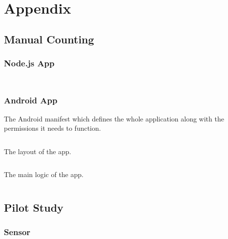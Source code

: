 \chapter{Appendix}

\cleardoublepage

\section{Manual Counting}

\subsection{Node.js App} \label{appendix:manualcount}
\vspace{1em}
\inputminted{javascript}{tools/manual-count/package.json}
\inputminted{javascript}{tools/manual-count/manualcount.js}

\subsection{Android App} \label{appendix:clicker}
\vspace{1em}
The Android manifest which defines the whole application along with the permissions it needs to function.
\inputminted{xml}{tools/clicker/manifest.xml}
\vspace{1em}
The layout of the app.
\inputminted{xml}{tools/clicker/layout.xml}
\vspace{1em}
The main logic of the app.
\inputminted{java}{tools/clicker/activity.java}
\pagebreak

\section{Pilot Study}

\subsection{Sensor} \label{appendix:pilot:sensor}
\vspace{1em}
\inputminted{javascript}{tools/pilot-study/sensor-package.json}
\inputminted{javascript}{tools/pilot-study/sensor-collect.js}
\inputminted{bash}{tools/pilot-study/sensor-collect.sh}

